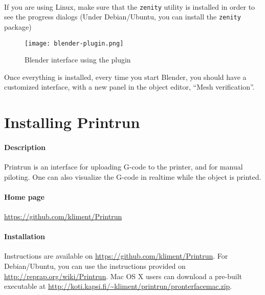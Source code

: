 \documentclass{article}
\begin{document}
	
	\paragraph{} If you are using Linux, make sure that the \texttt{zenity} utility is installed in order to see the progress dialogs (Under Debian/Ubuntu, you can install the \texttt{zenity} package)

	\begin{figure}[h!]
		\centering
		\texttt{[image: blender-plugin.png]}
		\caption{Blender interface using the plugin}
	\end{figure}

	Once everything is installed, every time you start Blender, you should have a customized interface, with a new panel in the object editor, “Mesh verification”.

\newpage

\section{Installing Printrun}

	\paragraph{Description} Printrun is an interface for uploading G-code to the printer, and for manual piloting. One can also visualize the G-code in realtime while the object is printed.

	\paragraph{Home page} \url{https://github.com/kliment/Printrun}

	\paragraph{Installation} Instructions are available on \url{https://github.com/kliment/Printrun}. For Debian/Ubuntu, you can use the instructions provided on \url{http://reprap.org/wiki/Printrun}. Mac OS X users can download a pre-built executable at \url{http://koti.kapsi.fi/~kliment/printrun/pronterfacemac.zip}.
\end{document}

